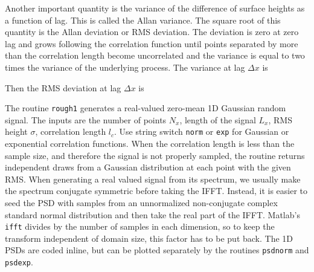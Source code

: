 Another important quantity is the variance of the difference of surface heights as a function of lag. This is called the Allan variance. The square root of this quantity is the Allan deviation or RMS deviation. The deviation is zero at zero lag and grows following the correlation function until points separated by more than the correlation length become uncorrelated and the variance is equal to two times the variance of the underlying process. The variance at lag $\Delta x$ is 

Then the RMS deviation at lag $\Delta x$ is 



%
%



The routine \texttt{rough1} generates a real-valued zero-mean 1D Gaussian random signal. The inputs are the number of points $N_x$, length of the signal $L_x$, RMS height $\sigma$, correlation length $l_c$. Use string switch \texttt{norm} or \texttt{exp} for Gaussian or exponential correlation functions. When the correlation length is less than the sample size, and therefore the signal is not properly sampled, the routine returns independent draws from a Gaussian distribution at each point with the given RMS. When generating a real valued signal from its spectrum, we usually make the spectrum conjugate symmetric before taking the IFFT. Instead, it is easier to seed the PSD with samples from an unnormalized non-conjugate complex standard normal distribution and then take the real part of the IFFT.  Matlab's \texttt{ifft} divides by the number of samples in each dimension, so to keep the transform independent of domain size, this factor has to be put back. The 1D PSDs are coded inline, but can be plotted separately by the routines \texttt{psdnorm} and \texttt{psdexp}.  


